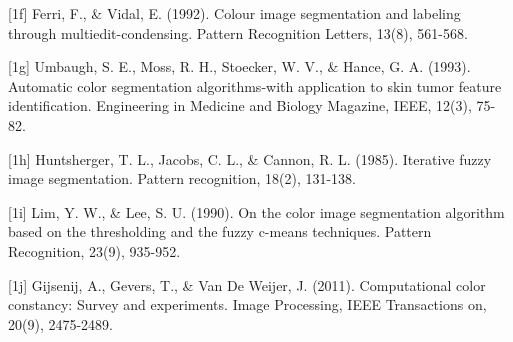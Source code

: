 \documentclass{article} %
\begin{document}
{[1f] Ferri, F., \& Vidal, E. (1992). Colour image segmentation and labeling through multiedit-condensing. Pattern Recognition Letters, 13(8), 561-568.

[1g] Umbaugh, S. E., Moss, R. H., Stoecker, W. V., \& Hance, G. A. (1993). Automatic color segmentation algorithms-with application to skin tumor feature identification. Engineering in Medicine and Biology Magazine, IEEE, 12(3), 75-82.

[1h] Huntsherger, T. L., Jacobs, C. L., \& Cannon, R. L. (1985). Iterative fuzzy image segmentation. Pattern recognition, 18(2), 131-138.

[1i] Lim, Y. W., \& Lee, S. U. (1990). On the color image segmentation algorithm based on the thresholding and the fuzzy c-means techniques. Pattern Recognition, 23(9), 935-952.

[1j] Gijsenij, A., Gevers, T., \& Van De Weijer, J. (2011). Computational color constancy: Survey and experiments. Image Processing, IEEE Transactions on, 20(9), 2475-2489.



}
\end{document}
